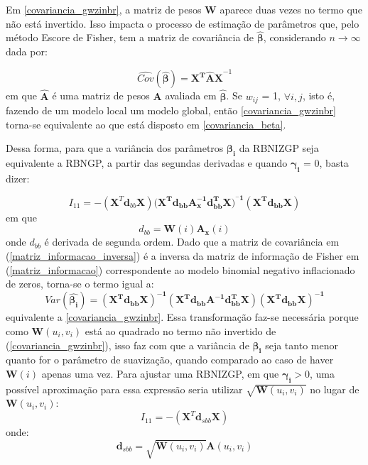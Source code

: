 \documentclass[12pt, a4paper, twoside]{report}
\numberwithin{equation}{section} %
\begin{document}
Em \eqref{covariancia_gwzinbr}, a matriz de pesos $\boldsymbol{W}$ aparece duas vezes no termo que não está invertido. Isso impacta o processo de estimação de parâmetros que, pelo método Escore de Fisher, tem a matriz de covariância de $\boldsymbol{\hat{\beta}}$, considerando $n \rightarrow \infty$ dada por:

\begin{equation}
    \widehat{Cov}(\boldsymbol{\hat{\beta}}) = \boldsymbol{X^{T}\hat{A}X}^{-1}
    \label{covariancia_beta}
\end{equation}
em que $\boldsymbol{\hat{A}}$ é uma matriz de pesos $\boldsymbol{A}$ avaliada em $\boldsymbol{\hat{\beta}}$. Se $w_{ij}$ = 1, $\forall i, j$, isto é, fazendo de um modelo local um modelo global, então \eqref{covariancia_gwzinbr} torna-se equivalente ao que está disposto em \eqref{covariancia_beta}. 

Dessa forma, para que a variância dos parâmetros $\boldsymbol{\beta_i}$ da RBNIZGP seja equivalente a RBNGP, a partir das segundas derivadas e quando $\boldsymbol{\gamma_i}$ = 0, basta dizer:

\begin{equation}
    I_{11} = -(\textbf{X}^{T}\textbf{d}_{bb}\textbf{X})(\boldsymbol{X^{T}d_{bb}A_{x}^{-1}d_{bb}^{T}X)^{^-1}(X^{T}d_{bb}X)}
\end{equation}
em que %
\begin{equation}
    d_{bb} = \boldsymbol{W}(i)\boldsymbol{A_{x}}(i)
\end{equation}
onde $d_{bb}$ é derivada de segunda ordem. Dado que a matriz de covariância em (\ref{matriz_informacao_inversa}) é a inversa da matriz de informação de Fisher em (\ref{matriz_informacao}) correspondente ao modelo binomial negativo inflacionado de zeros, torna-se o termo igual a:
\begin{equation}
    Var(\boldsymbol{\hat{\beta_i}}) = \boldsymbol{(X^{T}d_{bb}X)^{-1}(X^{T}d_{bb}A^{-1}d_{bb}^{T}X)(X^{T}d_{bb}X)^{-1}}
\end{equation}
equivalente a \eqref{covariancia_gwzinbr}. Essa transformação faz-se necessária porque como $\boldsymbol{W}(u_{i},v_{i})$ está ao quadrado no termo não invertido de (\ref{covariancia_gwzinbr}), isso faz com que a variância de $\boldsymbol{\beta_i}$ seja tanto menor quanto for o parâmetro de suavização, quando comparado ao caso de haver $\boldsymbol{W}(i)$ apenas uma vez. Para ajustar uma RBNIZGP, em que $\boldsymbol{\gamma_i} >$0, uma possível aproximação para essa expressão seria utilizar $\sqrt{\boldsymbol{W}(u_i,v_i)}$ no lugar de $\boldsymbol{W}(u_i,v_i)$:
\begin{equation}
    I_{11} = -(\textbf{X}^{T}\textbf{d}_{sbb}\textbf{X})
\end{equation}
onde:
\begin{equation}
    \textbf{d}_{sbb} = \sqrt{\textbf{W}(u_{i},v_{i})}\textbf{A}(u_{i},v_{i})
\end{equation}
\end{document}
